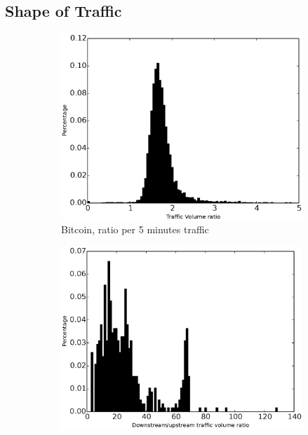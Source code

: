 \subsection{Shape of Traffic}\label{sec:shape_of_traffic}
\begin{figure}
\centering
\begin{subfigure}{0.32\linewidth}
\includegraphics[width=\linewidth]{image/ratio_downstream_upstream_traffic_volume_bitcoin.eps}
\caption{Bitcoin, ratio per 5 minutes traffic}
\label{fig:ratio_downstream_upstream_traffic_volume_bitcoin}
\end{subfigure}
\begin{subfigure}{0.32\linewidth}
\includegraphics[width=\linewidth]{image/ratio_downstream_upstream_traffic_volume_http.eps}

\end{subfigure}
\end{figure}
